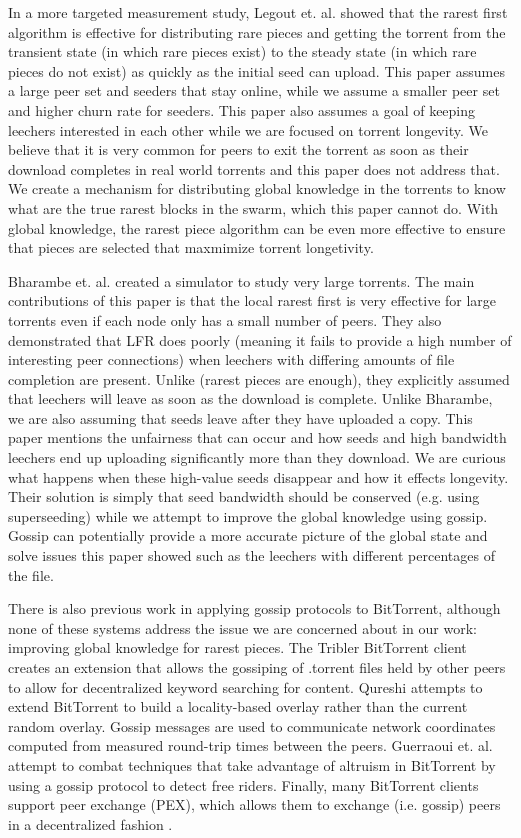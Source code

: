 In a more targeted measurement study, Legout et. al. \cite{legout:1} showed
that the rarest first algorithm is effective for distributing rare
pieces and getting the torrent from the transient state (in which
rare pieces exist) to the steady state (in which rare pieces do not
exist) as quickly as the initial seed can upload. This paper assumes
a large peer set and seeders that stay online, while we assume a
smaller peer set and higher churn rate for seeders. This paper also
assumes a goal of keeping leechers interested in each other while we
are focused on torrent longevity. We believe that it is very common
for peers to exit the torrent as soon as their download completes in
real world torrents and this paper does not address that. We create
a mechanism for distributing global knowledge in the torrents to
know what are the true rarest blocks in the swarm, which this paper
cannot do. With global knowledge, the rarest piece algorithm can be
even more effective to ensure that pieces are selected that maxmimize
torrent longetivity.  

Bharambe et. al. \cite{bharambe} created a simulator to
study very large torrents. The main contributions of this paper is
that the local rarest first is very effective for large torrents even
if each node only has a small number of peers. They also demonstrated
that LFR does poorly (meaning it fails to provide a high number of
interesting peer connections) when leechers with differing amounts
of file completion are present. Unlike (rarest pieces are enough),
they explicitly assumed that leechers will leave as soon as the
download is complete. Unlike Bharambe, we are also assuming that seeds
leave after they have uploaded a copy. This paper mentions the
unfairness that can occur and how seeds and high bandwidth leechers
end up uploading significantly more than they download. We are
curious what happens when these high-value seeds disappear and how
it effects longevity. Their solution is simply that seed bandwidth
should be conserved (e.g. using superseeding) while we attempt to
improve the global knowledge using gossip. Gossip can potentially
provide a more accurate picture of the global state and solve issues
this paper showed such as the leechers with different percentages of
the file.  

There is also previous work in applying gossip protocols to
BitTorrent, although none of these systems address the issue we are
concerned about in our work: improving global knowledge for rarest
pieces. The Tribler BitTorrent \cite{tribler} client creates an extension
that allows the gossiping of .torrent files held by other peers
to allow for decentralized keyword searching for content. Qureshi
\cite{proximity} attempts to extend BitTorrent to build a locality-based overlay
rather than the current random overlay. Gossip messages are used to
communicate network coordinates computed from measured round-trip
times between the peers. Guerraoui et. al. \cite{freerider} attempt to combat
techniques that take advantage of altruism in BitTorrent by using
a gossip protocol to detect free riders. Finally, many BitTorrent
clients support peer exchange (PEX), which allows them to exchange
(i.e. gossip) peers in a decentralized fashion \cite{pex}.
